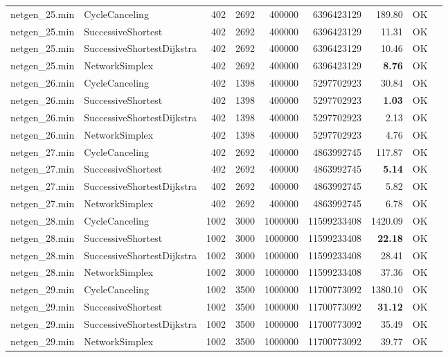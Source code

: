 \begin{longtable}{llrrrrrrl}
\midrule
netgen\_25.min & CycleCanceling & 402 & 2692 & 400000 & 6396423129 & 189.80 & OK \\
netgen\_25.min & SuccessiveShortest & 402 & 2692 & 400000 & 6396423129 & 11.31 & OK \\
netgen\_25.min & SuccessiveShortestDijkstra & 402 & 2692 & 400000 & 6396423129 & 10.46 & OK \\
netgen\_25.min & NetworkSimplex & 402 & 2692 & 400000 & 6396423129 & \textbf{8.76} & OK \\
\midrule
netgen\_26.min & CycleCanceling & 402 & 1398 & 400000 & 5297702923 & 30.84 & OK \\
netgen\_26.min & SuccessiveShortest & 402 & 1398 & 400000 & 5297702923 & \textbf{1.03} & OK \\
netgen\_26.min & SuccessiveShortestDijkstra & 402 & 1398 & 400000 & 5297702923 & 2.13 & OK \\
netgen\_26.min & NetworkSimplex & 402 & 1398 & 400000 & 5297702923 & 4.76 & OK \\
\midrule
netgen\_27.min & CycleCanceling & 402 & 2692 & 400000 & 4863992745 & 117.87 & OK \\
netgen\_27.min & SuccessiveShortest & 402 & 2692 & 400000 & 4863992745 & \textbf{5.14} & OK \\
netgen\_27.min & SuccessiveShortestDijkstra & 402 & 2692 & 400000 & 4863992745 & 5.82 & OK \\
netgen\_27.min & NetworkSimplex & 402 & 2692 & 400000 & 4863992745 & 6.78 & OK \\
\midrule
netgen\_28.min & CycleCanceling & 1002 & 3000 & 1000000 & 11599233408 & 1420.09 & OK \\
netgen\_28.min & SuccessiveShortest & 1002 & 3000 & 1000000 & 11599233408 & \textbf{22.18} & OK \\
netgen\_28.min & SuccessiveShortestDijkstra & 1002 & 3000 & 1000000 & 11599233408 & 28.41 & OK \\
netgen\_28.min & NetworkSimplex & 1002 & 3000 & 1000000 & 11599233408 & 37.36 & OK \\
\midrule
netgen\_29.min & CycleCanceling & 1002 & 3500 & 1000000 & 11700773092 & 1380.10 & OK \\
netgen\_29.min & SuccessiveShortest & 1002 & 3500 & 1000000 & 11700773092 & \textbf{31.12} & OK \\
netgen\_29.min & SuccessiveShortestDijkstra & 1002 & 3500 & 1000000 & 11700773092 & 35.49 & OK \\
netgen\_29.min & NetworkSimplex & 1002 & 3500 & 1000000 & 11700773092 & 39.77 & OK \\

\end{longtable}
